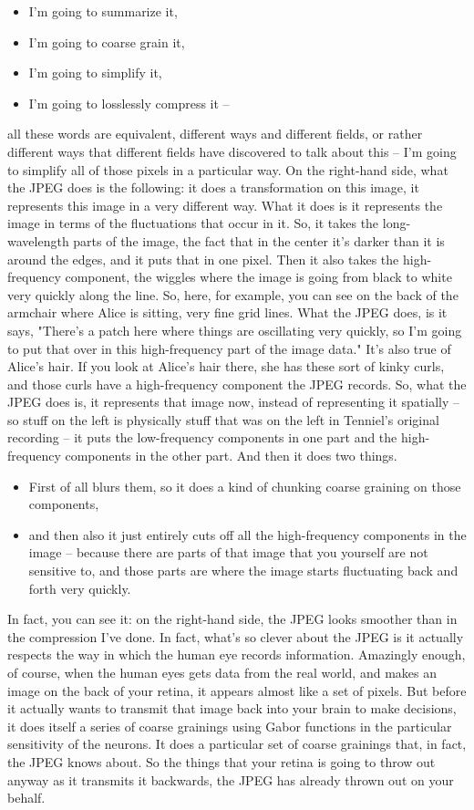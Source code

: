 \documentclass[]{article}
\begin{document}
\begin{itemize}
	\item I'm going to summarize it,
	\item I'm going to coarse grain it,
	\item I'm going to simplify it,
	\item I'm going to losslessly compress it –
\end{itemize}
all these words are equivalent,
different ways and different fields,
or rather different ways
that different fields
have discovered to talk about this –
I'm going to simplify all of those pixels
in a particular way.
On the right-hand side,
what the JPEG does is the following:
it does a transformation on this image,
it represents this image
in a very different way.
What it does is it represents the image
in terms of the fluctuations
that occur in it.
So, it takes the long-wavelength
parts of the image,
the fact that in the center
it's darker than it is around the edges,
and it puts that in one pixel.
Then it also takes
the high-frequency component,
the wiggles where the image is going
from black to white
very quickly along the line.
So, here, for example, you can see
on the back of the armchair
where Alice is sitting,
very fine grid lines.
What the JPEG does, is it says,
"There's a patch here where things
are oscillating very quickly,
so I'm going to put that over
in this high-frequency part
of the image data."
It's also true of Alice's hair.
If you look at Alice's hair there,
she has these sort of kinky curls,
and those curls
have a high-frequency component
the JPEG records.
So, what the JPEG does is,
it represents that image now,
instead of representing it spatially –
so stuff on the left
is physically stuff that was on the left
in Tenniel's original recording –
it puts the low-frequency components
in one part
and the high-frequency components
in the other part.
And then it does two things.

\begin{itemize}
	\item First of all blurs them,
	so it does a kind of chunking
	coarse graining on those components,
	\item and then also it just entirely cuts off
	all the high-frequency components
	in the image –
	because there are parts of that image
	that you yourself are not sensitive to,
	and those parts are where the image starts
	fluctuating back and forth very quickly.
\end{itemize}

In fact, you can see it:
on the right-hand side,
the JPEG looks smoother
than in the compression I've done.
In fact, what's so clever about the JPEG
is it actually respects the way
in which the human eye
records information.
Amazingly enough, of course,
when the human eyes
gets data from the real world,
and makes an image
on the back of your retina,
it appears almost like a set of pixels.
But before it actually wants to transmit
that image back into your brain
to make decisions,
it does itself
a series of coarse grainings
using Gabor functions in the particular
sensitivity of the neurons.
It does a particular set
of coarse grainings
that, in fact, the JPEG knows about.
So the things that your retina
is going to throw out anyway
as it transmits it backwards,
the JPEG has already thrown out
on your behalf.
\end{document}
